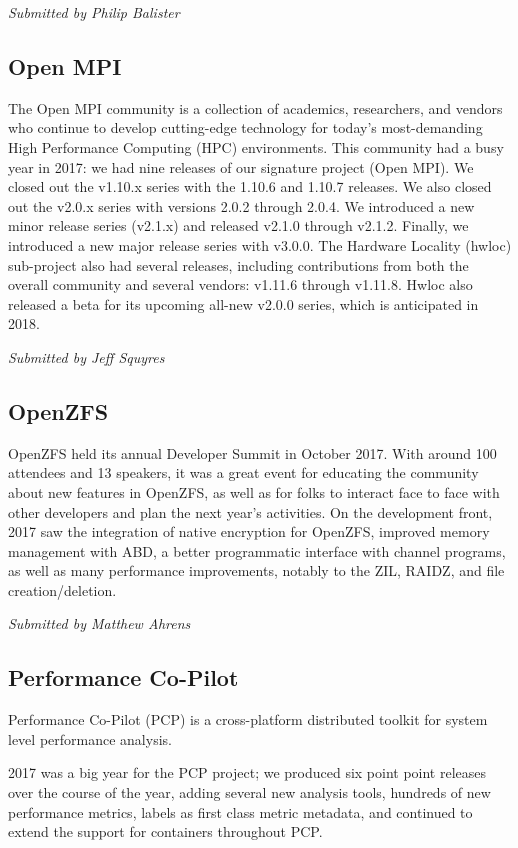 \documentclass[a4paper]{report}
\begin{document}
{\em Submitted by Philip Balister}

\subsection{Open MPI}

The Open MPI community is a collection of academics, researchers, and
vendors who continue to develop cutting-edge technology for today's
most-demanding High Performance Computing (HPC) environments.  This
community had a busy year in 2017: we had nine releases of our signature
project (Open MPI).  We closed out the v1.10.x series with the 1.10.6
and 1.10.7 releases.  We also closed out the v2.0.x series with versions
2.0.2 through 2.0.4.  We introduced a new minor release series (v2.1.x)
and released v2.1.0 through v2.1.2.  Finally, we introduced a new major
release series with v3.0.0.  The Hardware Locality (hwloc) sub-project
also had several releases, including contributions from both the overall
community and several vendors: v1.11.6 through v1.11.8.  Hwloc also
released a beta for its upcoming all-new v2.0.0 series, which is
anticipated in 2018.

{\em Submitted by Jeff Squyres}

\subsection{OpenZFS}

OpenZFS held its annual Developer Summit in October 2017.  With around
100 attendees and 13 speakers, it was a great event for educating the
community about new features in OpenZFS, as well as for folks to
interact face to face with other developers and plan the next year's
activities.  On the development front, 2017 saw the integration of
native encryption for OpenZFS, improved memory management with ABD, a
better programmatic interface with channel programs, as well as many
performance improvements, notably to the ZIL, RAIDZ, and file
creation/deletion.

{\em Submitted by Matthew Ahrens}

\subsection{Performance Co-Pilot}

Performance Co-Pilot (PCP) is a cross-platform distributed toolkit for
system level performance analysis.

2017 was a big year for the PCP project; we produced six point point
releases over the course of the year, adding several new analysis tools,
hundreds of new performance metrics, labels as first class metric
metadata, and continued to extend the support for containers throughout
PCP.
\end{document}
